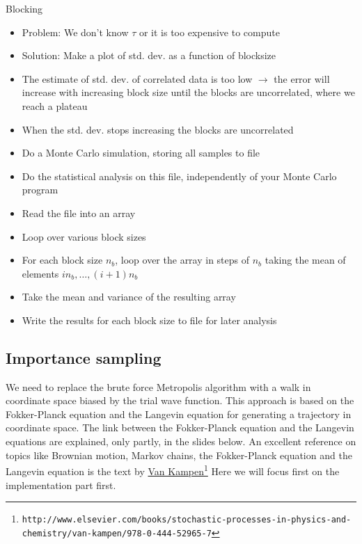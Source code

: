 \documentclass[graybox,sectrefs,envcountresetchap,open=right]{svmonodo}
\begin{document}
\noindent
 Blocking
\begin{itemize}
    \item Problem: We don't know $\tau$ or it is too expensive to compute

    \item Solution: Make a plot of std. dev. as a function of blocksize

    \item The estimate of std. dev. of correlated data is too low $\to$ the error will increase with increasing block size until the blocks are uncorrelated, where we reach a plateau

    \item When the std. dev. stops increasing the blocks are uncorrelated

    \item Do a Monte Carlo simulation, storing all samples to file

    \item Do the statistical analysis on this file, independently of your Monte Carlo program

    \item Read the file into an array

    \item Loop over various block sizes

    \item For each block size $n_b$, loop over the array in steps of $n_b$ taking the mean of elements $i n_b,\ldots,(i+1) n_b$

    \item Take the mean and variance of the resulting array

    \item Write the results for each block size to file for later
      analysis
\end{itemize}

\noindent
\subsection{Importance sampling}

We need to replace the brute force
Metropolis algorithm with a walk in coordinate space biased by the trial wave function.
This approach is based on the Fokker-Planck equation and the Langevin equation for generating a trajectory in coordinate space.  The link between the Fokker-Planck equation and the Langevin equations are explained, only partly, in the slides below.
An excellent reference on topics like Brownian motion, Markov chains, the Fokker-Planck equation and the Langevin equation is the text by  \href{{http://www.elsevier.com/books/stochastic-processes-in-physics-and-chemistry/van-kampen/978-0-444-52965-7}}{Van Kampen}\footnote{\texttt{http://www.elsevier.com/books/stochastic-processes-in-physics-and-chemistry/van-kampen/978-0-444-52965-7}}
Here we will focus first on the implementation part first.
\end{document}
